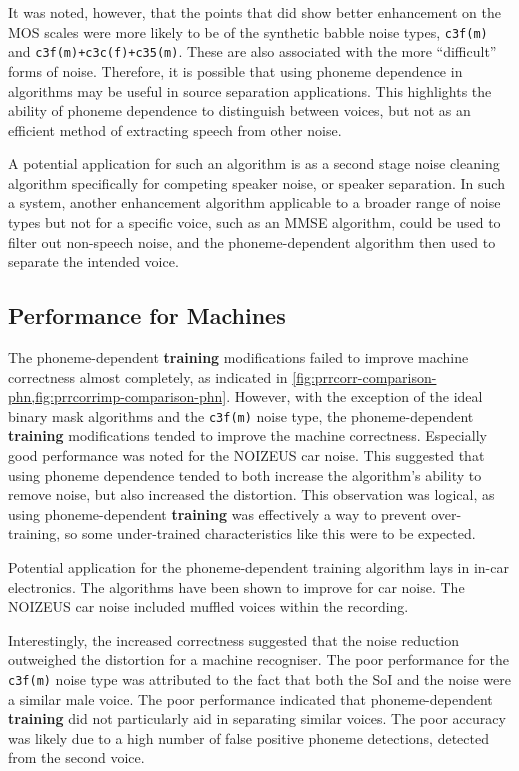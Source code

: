 It was noted, however, that the points that did show better enhancement
on the \ac{MOS} scales were more likely to be of the synthetic babble
noise types, \lstinline!c3f(m)! and \lstinline!c3f(m)+c3c(f)+c35(m)!.
These are also associated with the more ``difficult'' forms of noise.
Therefore, it is possible that using phoneme dependence in algorithms
may be useful in source separation applications. This highlights the
ability of phoneme dependence to distinguish between voices, but not
as an efficient method of extracting speech from other noise.

A potential application for such an algorithm is as a second stage
noise cleaning algorithm specifically for competing speaker noise,
or speaker separation. In such a system, another enhancement algorithm
applicable to a broader range of noise types but not for a specific
voice, such as an \ac{MMSE} algorithm, could be used to filter out
non-speech noise, and the phoneme-dependent algorithm then used to
separate the intended voice.


\subsection{Performance for Machines}

The phoneme-dependent \textbf{training} modifications failed to improve
machine correctness almost completely, as indicated in \cref{fig:prrcorr-comparison-phn,fig:prrcorrimp-comparison-phn}.
However, with the exception of the ideal binary mask algorithms and
the \lstinline!c3f(m)! noise type, the phoneme-dependent \textbf{training}
modifications tended to improve the machine correctness. Especially
good performance was noted for the NOIZEUS car noise. This suggested
that using phoneme dependence tended to both increase the algorithm's
ability to remove noise, but also increased the distortion. This observation
was logical, as using phoneme-dependent \textbf{training} was effectively
a way to prevent over-training, so some under-trained characteristics
like this were to be expected.

Potential application for the phoneme-dependent training algorithm
lays in in-car electronics. The algorithms have been shown to improve
for car noise. The NOIZEUS car noise included muffled voices within
the recording.

Interestingly, the increased correctness suggested that the noise
reduction outweighed the distortion for a machine recogniser. The
poor performance for the \lstinline!c3f(m)! noise type was attributed
to the fact that both the \ac{SoI} and the noise were a similar male
voice. The poor performance indicated that phoneme-dependent \textbf{training}
did not particularly aid in separating similar voices. The poor accuracy
was likely due to a high number of false positive phoneme detections,
detected from the second voice.


